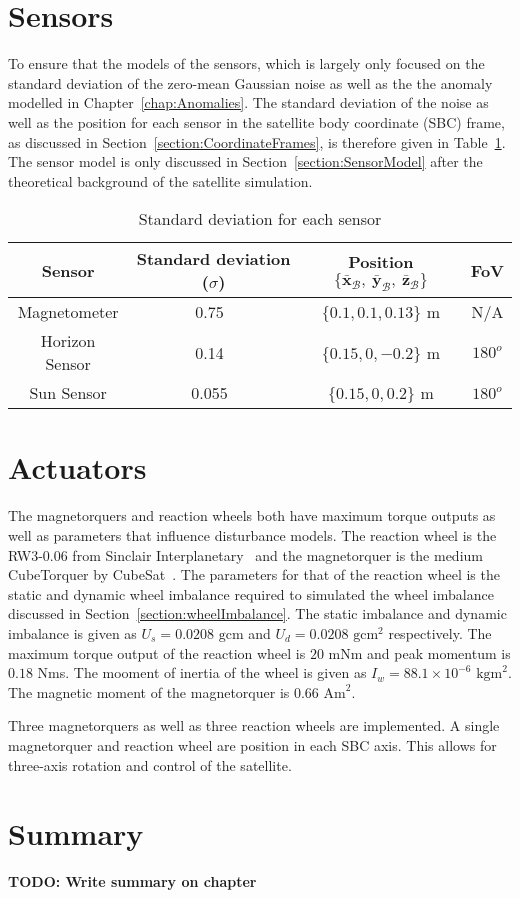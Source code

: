 \section{Sensors}
\label{section:SensorParameters}
To ensure that the models of the sensors, which is largely only focused on the standard deviation of the zero-mean Gaussian noise as well as the the anomaly modelled in Chapter~\ref{chap:Anomalies}. The standard deviation of the noise as well as the position for each sensor in the satellite body coordinate (SBC) frame, as discussed in Section~\ref{section:CoordinateFrames}, is therefore given in Table~\ref{Table:SensorNoise}. The sensor model is only discussed in Section~\ref{section:SensorModel} after the theoretical background of the satellite simulation.
\begin{table}[h!t!b]
	\centering
	\caption{\label{Table:SensorNoise}Standard deviation for each sensor}
	\begin{tabular}{c c c c}
		\hline\hline
		\textbf{Sensor} & Standard deviation ($\sigma$) & Position $\{\bar{\mathbf{x}}_{\mathcal{B}},~\bar{\mathbf{y}}_{\mathcal{B}},~\bar{\mathbf{z}}_{\mathcal{B}}\}$ & FoV\\ \hline
		Magnetometer & 0.75~\cite{MagnetometerAAC} & $\{0.1, 0.1, 0.13\}$ m & N/A\\
		Horizon Sensor & 0.14~\cite{wessels2018infrared} & $\{0.15, 0, -0.2\}$ m & $180^o$\\
		Sun Sensor & 0.055~\cite{SputnixSunSensor} & $\{0.15, 0, 0.2\}$ m & $180^o$\\
		\hline\hline
	\end{tabular}
\end{table}

\section{Actuators}
The magnetorquers and reaction wheels both have maximum torque outputs as well as parameters that influence disturbance models. The reaction wheel is the RW3-0.06 from Sinclair Interplanetary~\cite{reactionWheelSinclair} and the magnetorquer is the medium CubeTorquer by CubeSat~\cite{magnetorquerCubeSpace}. The parameters for that of the reaction wheel is the static and dynamic wheel imbalance required to simulated the wheel imbalance discussed in Section~\ref{section:wheelImbalance}. The static imbalance and dynamic imbalance is given as $U_s = 0.0208\text{ gcm}$ and $U_d = 0.0208\text{ gcm}^2$ respectively. The maximum torque output of the reaction wheel is $\num{20}$ mNm and peak momentum is $\num{0.18}$ Nms. The mooment of inertia of the wheel is given as $I_w = 88.1 \times 10^{-6} \text{ kgm}^2$. The magnetic moment of the magnetorquer is $\num{0.66}\text{ Am}^2$.

Three magnetorquers as well as three reaction wheels are implemented. A single magnetorquer and reaction wheel are position in each SBC axis. This allows for three-axis rotation and control of the satellite.

\section{Summary}
\textbf{TODO: Write summary on chapter}